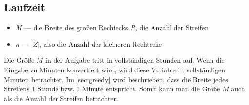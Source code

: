 \subsection{Laufzeit}
\begin{itemize}
	\item $M$ --- die Breite des großen Rechtecks $R$, die Anzahl der Streifen 
	\item $n$ --- $|Z|$, also die Anzahl der kleineren Rechtecke
\end{itemize}

Die Größe $M$ in der Aufgabe tritt in vollständigen Stunden auf.
Wenn die Eingabe zu Minuten konvertiert wird, wird diese Variable
in vollständigen Minuten betrachtet.
Im \cref{sec:greedy} wird beschrieben,
dass die Breite jedes Streifens 1 Stunde bzw. 1 Minute entspricht.
Somit kann man die Größe $M$ auch als die Anzahl der Streifen betrachten.


